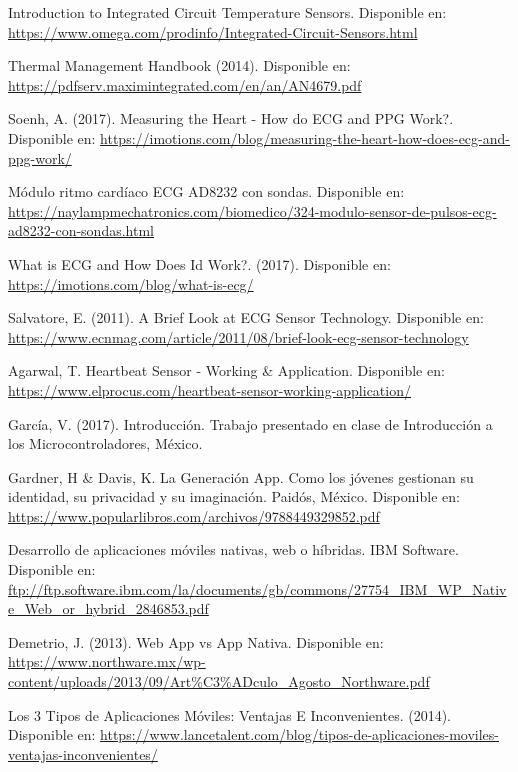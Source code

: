 \begin{thebibliography}{0}
	 Introduction to Integrated Circuit Temperature Sensors. Disponible en: \url{https://www.omega.com/prodinfo/Integrated-Circuit-Sensors.html}
	
	 Thermal Management Handbook (2014). Disponible en: \url{https://pdfserv.maximintegrated.com/en/an/AN4679.pdf}
	
	 Soenh, A. (2017). Measuring the Heart - How do ECG and PPG Work?. Disponible en: \url{https://imotions.com/blog/measuring-the-heart-how-does-ecg-and-ppg-work/}
	
	 Módulo ritmo cardíaco ECG AD8232 con sondas. Disponible en: \url{https://naylampmechatronics.com/biomedico/324-modulo-sensor-de-pulsos-ecg-ad8232-con-sondas.html}
	
	 What is ECG and How Does Id Work?. (2017). Disponible en: \url{https://imotions.com/blog/what-is-ecg/}
	
	 Salvatore, E. (2011). A Brief Look at ECG Sensor Technology. Disponible en: \url{https://www.ecnmag.com/article/2011/08/brief-look-ecg-sensor-technology}
	
	 Agarwal, T. Heartbeat Sensor - Working \& Application. Disponible en: \url{https://www.elprocus.com/heartbeat-sensor-working-application/}
	
	 García, V. (2017). Introducción. Trabajo presentado en clase de Introducción a los Microcontroladores, México.
	
	 Gardner, H \& Davis, K. La Generación App. Como los jóvenes gestionan su identidad, su privacidad y su imaginación. Paidós, México. Disponible en: \url{https://www.popularlibros.com/archivos/9788449329852.pdf}
	
	 Desarrollo de aplicaciones móviles nativas, web o híbridas. IBM Software. Disponible en: \url{ftp://ftp.software.ibm.com/la/documents/gb/commons/27754_IBM_WP_Native_Web_or_hybrid_2846853.pdf}
	
	 Demetrio, J. (2013). Web App vs App Nativa. Disponible en: \url{https://www.northware.mx/wp-content/uploads/2013/09/Art%C3%ADculo_Agosto_Northware.pdf}
		
	 Los 3 Tipos de Aplicaciones Móviles: Ventajas E Inconvenientes. (2014). Disponible en: \url{https://www.lancetalent.com/blog/tipos-de-aplicaciones-moviles-ventajas-inconvenientes/}
	

\end{thebibliography}
